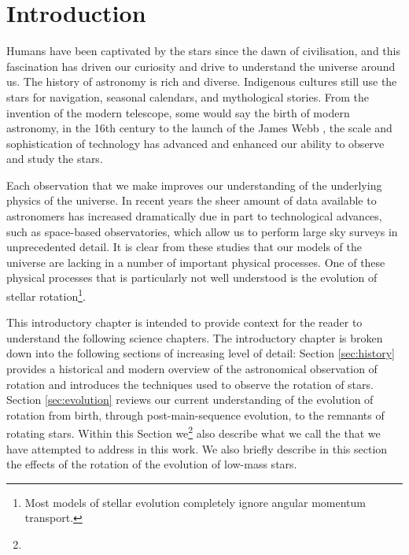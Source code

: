 
\newcommand\dive{\textmd{div}}
\newcommand\der{\textmd{d}}
\newcommand\rper{$R_{\rm{per}}$}

\chapter{Introduction}
\label{chap:intro}

Humans have been captivated by the stars since the dawn of civilisation, and this fascination has driven our curiosity and drive to understand the universe around us. 
The history of astronomy is rich and diverse. 
Indigenous cultures still use the stars for navigation, seasonal calendars, and mythological stories. 
From the invention of the modern telescope, some would say the birth of modern astronomy, in the 16th century to the launch of the James Webb , the scale and sophistication of technology has advanced and enhanced our ability to observe and study the stars. 

Each observation that we make improves our understanding of the underlying physics of the universe. 
In recent years the sheer amount of data available to astronomers has increased dramatically due in part to technological advances, such as space-based observatories, which allow us to perform large sky surveys in unprecedented detail. 
It is clear from these studies that our models of the universe are lacking in a number of important physical processes. 
One of these physical processes that is particularly not well understood is the evolution of stellar rotation\footnote{Most models of stellar evolution completely ignore angular momentum transport.}.

This introductory chapter is intended to provide context for the reader to understand the following science chapters. 
The introductory chapter is broken down into the following sections of increasing level of detail:
Section \ref{sec:history} provides a historical and modern overview of the astronomical observation of rotation and introduces the techniques used to observe the rotation of stars.
Section \ref{sec:evolution} reviews our current understanding of the evolution of rotation from birth, through post-main-sequence evolution, to the remnants of rotating stars. Within this Section we\footnote{} also describe what we call the  that we have attempted to address in this work. We also briefly describe in this section the effects of the rotation of the evolution of low-mass stars.


